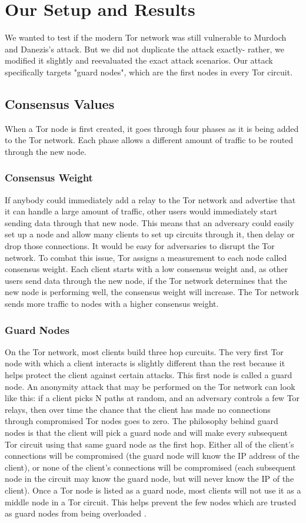 \documentclass[12pt,journal]{IEEEtran}
\begin{document}
\section{Our Setup and Results}
We wanted to test if the modern Tor network was still vulnerable to Murdoch and Danezis's attack. But we did not duplicate the attack exactly- rather, we modified it slightly and reevaluated the exact attack scenarios. Our attack specifically targets "guard nodes", which are the first nodes in every Tor circuit.
\subsection{Consensus Values}
When a Tor node is first created, it goes through four phases as it is being added to the Tor network. Each phase allows a different amount of traffic to be routed through the new node.
\subsubsection{Consensus Weight}
If anybody could immediately add a relay to the Tor network and advertise that it can handle a large amount of traffic, other users would immediately start sending data through that new node. This means that an adversary could easily set up a node and allow many clients to set up circuits through it, then delay or drop those connections. It would be easy for adversaries to disrupt the Tor network. To combat this issue, Tor assigns a measurement to each node called consensus weight. Each client starts with a low consensus weight and, as other users send data through the new node, if the Tor network determines that the new node is performing well, the consensus weight will increase. The Tor network sends more traffic to nodes with a higher consensus weight.
\subsubsection{Guard Nodes}
On the Tor network, most clients build three hop curcuits. The very first Tor node with which a client interacts is slightly different than the rest because it helps protect the client against certain attacks. This first node is called a guard node. An anonymity attack that may be performed on the Tor network can look like this: if a client picks N paths at random, and an adversary controls a few Tor relays, then over time the chance that the client has made no connections through compromised Tor nodes goes to zero. The philosophy behind guard nodes is that the client will pick a guard node and will make every subsequent Tor circuit using that same guard node as the first hop. Either all of the client's connections will be compromised (the guard node will know the IP address of the client), or none of the client's connections will be compromised (each subsequent node in the circuit may know the guard node, but will never know the IP of the client). Once a Tor node is listed as a guard node, most clients will not use it as a middle node in a Tor circuit. This helps prevent the few nodes which are trusted as guard nodes from being overloaded \cite{arma2013}.
\end{document}
